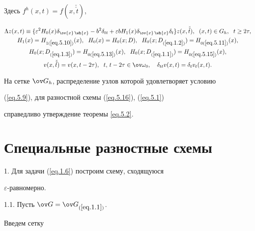 Здесь $f^h(x, t)=f(x, \check{\check{t}})$,


\begin{gather*}


\Lambda z(x, t)\equiv \{\varepsilon^2 H_0(x) \delta_{\ov{x}\,\wh{x}}-b^2


\delta_{tt}+\varepsilon b H_1(x) \delta_{\ov{x}\,\wh{x}}


\delta_t\}z(x,\Check{\Check{t}}), \ \; (x, t)\in G_h, \ \; t\ge 2\tau,\\


H_1(x)=H_{1(\ref{eq.5.10})}(x), \ \; H_0(x)=H_0(x; D),\ \;


H_0(x; D_{(\ref{eq.1.2})})=H_{0(\ref{eq.5.11})}(x), \\


H_0(x; D_{(\ref{eq.1.3})})=H_{0(\ref{eq.5.13})}(x), \ \;


H_0(x; D_{(\ref{eq.1.1})})=H_{0(\ref{eq.5.15})}(x),\\


v(x, \Check{\Check{t}})=v(x, t-2\tau), \ \;


t, \, t-2\tau\in \ov\omega_0, \quad \delta_{tt} v(x, t)=\delta_t v_t(x,t).


\end{gather*}





На сетке $\ov G_h$, распределение узлов которой удовлетворяет условию


(\ref{eq.5.9}), для разностной схемы (\ref{eq.5.16}), (\ref{eq.5.1})


справедливо утверждение теоремы \ref{eq.5.2}.





\section{Специальные разностные схемы}


\label{section.6}





1. Для задачи (\ref{eq.1.6}) построим схему, сходящуюся


$\varepsilon$-равномерно.





1.1. Пусть $\ov G=\ov G_{(\ref{eq.1.1})}$.


Введем сетку \vspace{-1mm}


